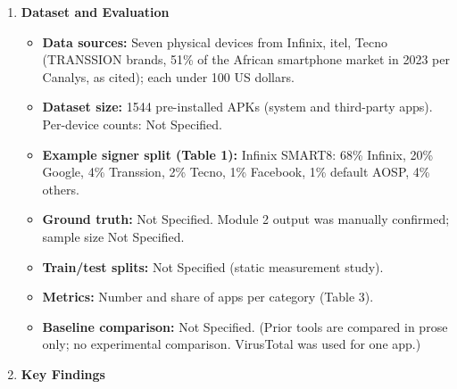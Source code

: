 \documentclass[11pt,a4paper]{article}
\newcommand{\entrypart}[1]{\textbf{\color{accent}#1}\par\vspace{2pt}}
\begin{document}
\begin{enumerate}
    \item \entrypart{Dataset and Evaluation}

    \begin{itemize}[leftmargin=*,itemsep=1pt,topsep=2pt]
        \item \textbf{Data sources:} Seven physical devices from Infinix, itel, Tecno (TRANSSION brands, 51\% of the African smartphone market in 2023 per Canalys, as cited); each under 100 US dollars.
        \item \textbf{Dataset size:} 1544 pre-installed APKs (system and third-party apps). Per-device counts: Not Specified.
        \item \textbf{Example signer split (Table 1):} Infinix SMART8: 68\% Infinix, 20\% Google, 4\% Transsion, 2\% Tecno, 1\% Facebook, 1\% default AOSP, 4\% others.
        \item \textbf{Ground truth:} Not Specified. Module 2 output was manually confirmed; sample size Not Specified.
        \item \textbf{Train/test splits:} Not Specified (static measurement study).
        \item \textbf{Metrics:} Number and share of apps per category (Table 3).
        \item \textbf{Baseline comparison:} Not Specified. (Prior tools are compared in prose only; no experimental comparison. VirusTotal was used for one app.)
    \end{itemize}

    \item \entrypart{Key Findings}


\end{enumerate}
\end{document}
